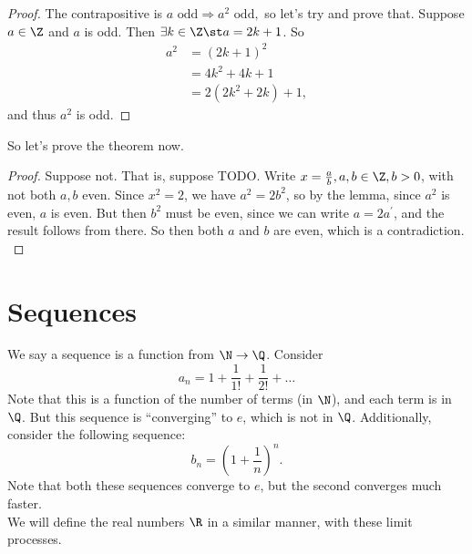 \documentclass{notes}
\begin{document}
\begin{proof}
The contrapositive is $a\text{ odd}\Rightarrow a^2\text{ odd},$ so let's try and prove that. Suppose
$a\in\Z$ and $a$ is odd. Then $\exists k\in\Z \st a = 2k + 1$. So 
\begin{align*}
  a^2 &= (2k + 1)^2 \\
  &= 4k^2 + 4k + 1 \\
  &= 2(2k^2 + 2k) + 1,
\end{align*}
and thus $a^2$ is odd. 
\end{proof}

So let's prove the theorem now. 

\begin{proof}
  Suppose not. That is, suppose TODO. Write $x = \frac{a}{b}, a,b\in\Z,
  b >0$, with not both $a,b$ even. Since $x^2 = 2$, we have $a^2 = 2b^2$, so by the lemma, since $a^2$ 
  is even, $a$ is even. But then $b^2$ must be even, since we can write $a = 2a^\prime$, and the result
  follows from there. So then both $a$ and $b$ are even, which is a contradiction. \\
\end{proof}

\section{Sequences}
We say a sequence is a function from $\N\to\Q$. Consider $$a_n = 1 + \frac{1}{1!} + \frac{1}{2!} + \ldots$$ 
Note that this is a function of the number of terms (in $\N$), and each term is in $\Q$. But this sequence
is ``converging'' to $e$, which is not in $\Q$. Additionally, consider the following sequence:
$$b_n = (1 + \frac{1}{n})^n.$$
Note that both these sequences converge to $e$, but the second converges much faster.\\

We will define the real numbers $\R$ in a similar manner, with these limit processes.
\end{document}
